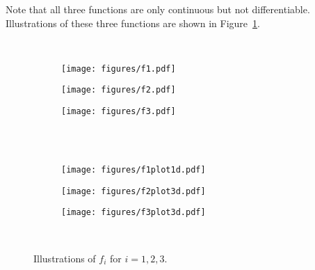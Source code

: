 \documentclass[11pt,a4paper]{article}
\begin{document}
Note that all three functions are only continuous but not differentiable. Illustrations of these three functions are shown in Figure~\ref{fig:f:123}. 


\begin{figure}[ht]%
            \centering
            \,\hfill
            \begin{subfigure}[b]{0.3227300245\textwidth}
                    \centering            
                    \texttt{[image: figures/f1.pdf]}
                \end{subfigure}
                \hfill
            \begin{subfigure}[b]{0.3227300245\textwidth}
                    \centering            \texttt{[image: figures/f2.pdf]}
                \end{subfigure}
                \hfill
            \begin{subfigure}[b]{0.3227300245\textwidth}
                    \centering            \texttt{[image: figures/f3.pdf]}
                \end{subfigure}
\hfill\, \\[5pt]
       \,\hfill
            \begin{subfigure}[b]{0.3227300245\textwidth}
                    \centering            
                    \texttt{[image: figures/f1plot1d.pdf]}
                \end{subfigure}
                \hfill
            \begin{subfigure}[b]{0.3227300245\textwidth}
                    \centering            \texttt{[image: figures/f2plot3d.pdf]}
                \end{subfigure}
                \hfill
            \begin{subfigure}[b]{0.3227300245\textwidth}
                    \centering            \texttt{[image: figures/f3plot3d.pdf]}
                \end{subfigure}
\hfill\,
\caption{Illustrations of $f_i$ for $i=1,2,3$.}

    \label{fig:f:123}
    
\end{figure}
\end{document}
